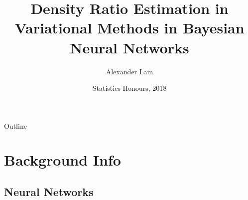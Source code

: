 \documentclass{beamer}
\title{Density Ratio Estimation in Variational Methods in Bayesian Neural Networks}
\author{Alexander Lam}
\institute[UNSW] %
{
  Department of Mathematics and Statistics\\
  UNSW
  }
\date{Statistics Honours, 2018}
\begin{document}
\begin{frame}
  \titlepage
\end{frame}

\begin{frame}{Outline}
  \tableofcontents
\end{frame}

\section{Background Info}

\subsection{Neural Networks}
\end{document}
